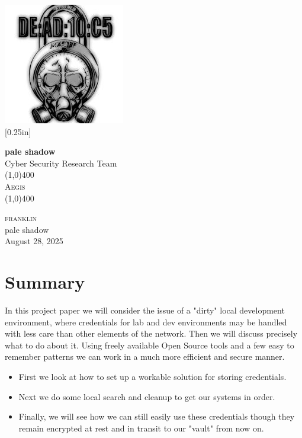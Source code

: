 \documentclass[11pt]{report}
\newcommand{\myTitle}{Aegis}
\newcommand{\myName}{franklin}
\newcommand{\myOrg}{pale shadow}
\newcommand{\myDate}{August 28, 2025}
\begin{document}
	
	\begin{titlepage}
		\begin{center}
			\includegraphics[scale=0.75]{../static/images/new_logo.jpeg}\\
			[0.25in] 
			
			\textbf{\Large{\myOrg}}\\
			\Large{Cyber Security Research Team}\\
			[1in]
			
			\line(1,0){400}\\
			[2mm]
			\textsc{\Large{\myTitle}} \\
			\line(1,0){400} \\
			[1in]
		\end{center}
		\begin{center}
			\textsc{\Large \myName}	\\
			\myOrg\\
			[1in]
			\myDate
		\end{center}
	\end{titlepage}
	
	\section*{Summary}
    In this project paper we will consider the issue of a "dirty" local development
    environment, where credentials for lab and dev environments may be handled with less care than other elements of the network.
    Then we will discuss precisely what to do about it. Using freely available
    Open Source tools and a few easy to remember patterns we can work in a
    much more efficient and secure manner.

    \begin{itemize}
    	\item First we look at how to set up a workable solution for storing credentials.
		\item Next we do some local search and cleanup to get our systems in order.
		\item Finally, we will see how we can still easily use these credentials though
			they remain encrypted at rest and in transit to our "vault" from now on.
    \end{itemize}
      
\end{document}
